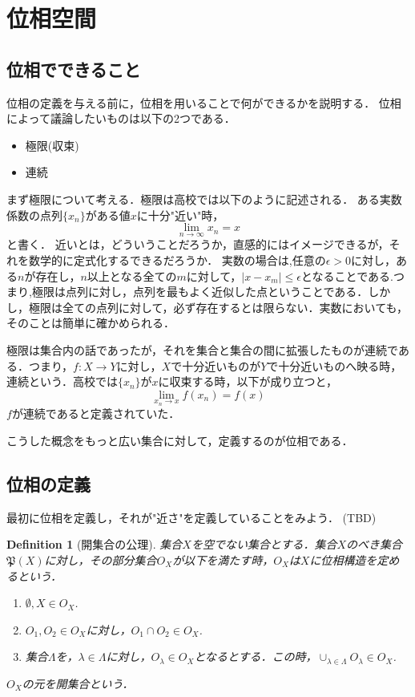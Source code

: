 \documentclass{ujarticle}
\newtheorem{dfn}[thm]{Definition}
\begin{document}
\section{位相空間}
\label{sec:位相空間}
\subsection{位相でできること}
\label{sub:位相でできること}
位相の定義を与える前に，位相を用いることで何ができるかを説明する．
位相によって議論したいものは以下の2つである．
\begin{itemize}
  \item 極限(収束)
  \item 連続
\end{itemize}

まず極限について考える．極限は高校では以下のように記述される．
ある実数係数の点列$\{ x_n \}$がある値$x$に十分"近い"時，
\begin{equation*}
 \lim_{n \to \infty} x_n=x
\end{equation*}
と書く．
近いとは，どういうことだろうか，直感的にはイメージできるが，それを数学的に定式化するできるだろうか．
実数の場合は,任意の$\epsilon \gt 0$に対し，ある$n$が存在し，$n$以上となる全ての$m$に対して，$|x - x_m| \le \epsilon$となることである.つまり,極限は点列に対し，点列を最もよく近似した点ということである．しかし，極限は全ての点列に対して，必ず存在するとは限らない．実数においても，そのことは簡単に確かめられる．

極限は集合内の話であったが，それを集合と集合の間に拡張したものが連続である．つまり，$f:X \to Y$に対し，$X$で十分近いものが$Y$で十分近いものへ映る時，連続という．高校では$\{x_n \}$が$x$に収束する時，以下が成り立つと，
\begin{equation*}
 \lim_{x_n \to x}f(x_n)=f(x)
\end{equation*}
$f$が連続であると定義されていた．

こうした概念をもっと広い集合に対して，定義するのが位相である．

\subsection{位相の定義}
\label{sub:位相の定義}
最初に位相を定義し，それが"近さ"を定義していることをみよう．
(TBD)

\begin{dfn}[開集合の公理]
 集合$X$を空でない集合とする．集合$X$のべき集合$\mathfrak{P}(X)$に対し，その部分集合$O_X$が以下を満たす時，$O_X$は$X$に位相構造を定めるという．
 \begin{enumerate}
   \item $\emptyset , X \in O_X$.
   \item $O_1,O_2 \in O_X$に対し，$O_1 \cap O_2 \in O_X$.
   \item 集合$\Lambda$を，$\lambda \in \Lambda$に対し，$O_{\lambda} \in O_X$となるとする．この時，$\displaystyle \cup_{\lambda \in \Lambda}O_{\lambda} \in O_X$.
 \end{enumerate}
 $O_X$の元を開集合という．
\end{dfn}
\end{document}
